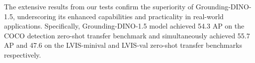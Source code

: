 The extensive results from our tests confirm the superiority of Grounding-DINO-1.5, underscoring its enhanced capabilities and practicality in real-world applications.
Specifically, Grounding-DINO-1.5 model achieved 54.3 AP on the COCO detection zero-shot transfer benchmark and simultaneously achieved 55.7 AP and 47.6 on the LVIS-minival and LVIS-val zero-shot transfer benchmarks respectively.



  
  \vspace{-2mm}